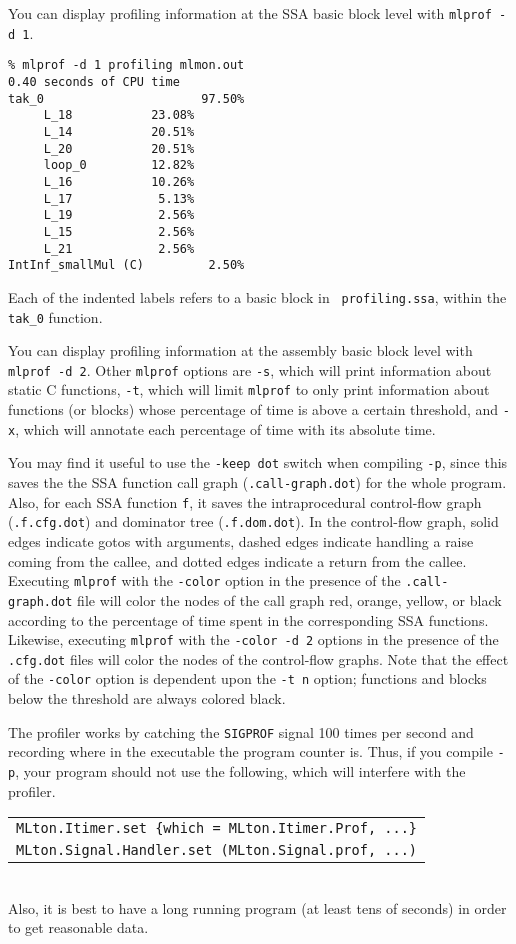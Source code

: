 You can display profiling information at the SSA basic block level with
{\tt mlprof -d 1}.

\begin{verbatim}
% mlprof -d 1 profiling mlmon.out
0.40 seconds of CPU time
tak_0                      97.50%
     L_18           23.08%       
     L_14           20.51%       
     L_20           20.51%       
     loop_0         12.82%       
     L_16           10.26%       
     L_17            5.13%       
     L_19            2.56%       
     L_15            2.56%       
     L_21            2.56%       
IntInf_smallMul (C)         2.50%
\end{verbatim}
Each of the indented labels refers to a basic block in {\tt
  profiling.ssa}, within the {\tt tak\_0} function.

You can display profiling information at the assembly basic block level with
{\tt mlprof -d 2}.  Other {\tt mlprof} options are
{\tt -s}, which will print information about static C functions, {\tt -t},
which will limit {\tt mlprof} to only print information about functions (or
blocks) whose percentage of time is above a certain threshold, and {\tt -x}, 
which will annotate each percentage of time with its absolute time.

You may find it useful to use the {\tt -keep dot} switch when
compiling {\tt -p}, since this saves the the SSA function call graph
({\tt .call-graph.dot}) for the whole program.  Also, for each SSA
function {\tt f}, it saves the intraprocedural control-flow graph
({\tt .f.cfg.dot}) and dominator tree ({\tt .f.dom.dot}).  In the
control-flow graph, solid edges indicate gotos with arguments, dashed
edges indicate handling a raise coming from the callee, and dotted
edges indicate a return from the callee.  Executing {\tt mlprof} with
the {\tt -color} option in the presence of the {\tt .call-graph.dot}
file will color the nodes of the call graph red, orange, yellow, or
black according to the percentage of time spent in the corresponding
SSA functions.  Likewise, executing {\tt mlprof} with the {\tt -color
  -d 2} options in the presence of the {\tt .cfg.dot} files will color
the nodes of the control-flow graphs.  Note that the effect of the
{\tt -color} option is dependent upon the {\tt -t n} option; functions
and blocks below the threshold are always colored black.

The profiler works by catching the {\tt SIGPROF} signal 100 times per second and
recording where in the executable the program counter is.  Thus, if you compile
{\tt -p}, your program should not use the following, which will interfere with
the profiler.\\
\begin{tabular}{l}
\tt MLton.Itimer.set \{which = MLton.Itimer.Prof, ...\}\\
\tt MLton.Signal.Handler.set (MLton.Signal.prof, ...)
\end{tabular}\\
Also, it is best to have a long running program (at least tens of seconds) in
order to get reasonable data. 

